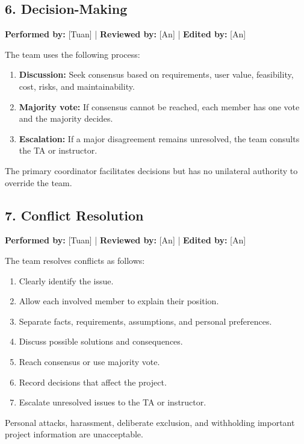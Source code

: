 \documentclass[12pt]{article}
\begin{document}
\subsection{6. Decision-Making}

\textbf{Performed by:} [Tuan] | \textbf{Reviewed by:} [An] | \textbf{Edited by:} [An]

The team uses the following process:

\begin{enumerate}
    \item \textbf{Discussion:} Seek consensus based on requirements, user value, feasibility, cost, risks, and maintainability.
    \item \textbf{Majority vote:} If consensus cannot be reached, each member has one vote and the majority decides.
    \item \textbf{Escalation:} If a major disagreement remains unresolved, the team consults the TA or instructor.
\end{enumerate}

The primary coordinator facilitates decisions but has no unilateral authority to override the team.

\subsection{7. Conflict Resolution}

\textbf{Performed by:} [Tuan] | \textbf{Reviewed by:} [An] | \textbf{Edited by:} [An]

The team resolves conflicts as follows:

\begin{enumerate}
    \item Clearly identify the issue.
    \item Allow each involved member to explain their position.
    \item Separate facts, requirements, assumptions, and personal preferences.
    \item Discuss possible solutions and consequences.
    \item Reach consensus or use majority vote.
    \item Record decisions that affect the project.
    \item Escalate unresolved issues to the TA or instructor.
\end{enumerate}

Personal attacks, harassment, deliberate exclusion, and withholding important project information are unacceptable.
\end{document}

